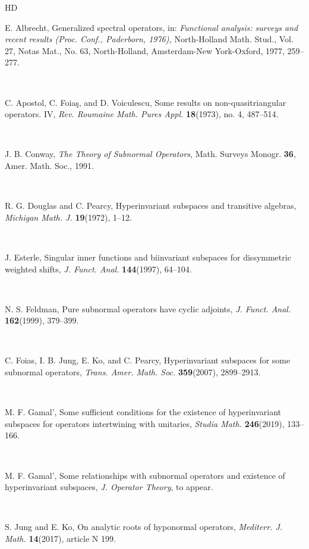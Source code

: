 \documentclass[a4paper,oneside,11pt]{amsart}
\numberwithin{equation}{section}
\theoremstyle{plain}
\theoremstyle{definition}
\begin{document}
\begin{thebibliography}{HD}

\normalsize
\baselineskip=11pt

 E. Albrecht, Generalized spectral operators, in: 
\emph{Functional analysis: surveys and recent results (Proc. Conf., Paderborn, 1976),} 
 North-Holland Math. Stud., Vol. 27, Notas Mat., No. 63, North-Holland,
Amsterdam-New York-Oxford, 1977, 259--277. 

\ 

 C. Apostol, C. Foia\c s, and D. Voiculescu, Some results on non-quasitriangular operators. IV, 
\emph{Rev. Roumaine Math. Pures Appl.} {\bf 18}(1973), no. 4, 487--514.

\ 

 J. B. Conway, \emph{The Theory of Subnormal Operators}, Math. Surveys Monogr. {\bf 36}, 
Amer. Math. Soc., 1991.

\ 

 R. G. Douglas and C. Pearcy, Hyperinvariant subspaces and transitive algebras, 
\emph{Michigan Math. J.}  {\bf 19}(1972), 1--12.
 
 \ 
 
 J. Esterle, Singular inner functions and biinvariant subspaces 
for dissymmetric weighted shifts,
 \emph{J. Funct.  Anal.} {\bf 144}(1997), 64--104.

\ 

  N. S. Feldman, Pure subnormal operators have cyclic adjoints, 
 \emph{J. Funct. Anal.} {\bf 162}(1999),  379--399.

\ 

 C. Foias, I. B. Jung, E. Ko, and C. Pearcy, Hyperinvariant subspaces for some subnormal operators, \emph{Trans. Amer. Math. Soc.} {\bf 359}(2007), 
2899--2913.


\ 

 M. F. Gamal', Some sufficient conditions for the existence 
of hyperinvariant subspaces for operators intertwining with unitaries,
\emph{Studia Math.} {\bf 246}(2019), 133--166. 

\ 

 M. F. Gamal', Some relationships with subnormal operators and existence of hyperinvariant subspaces, \emph{J. Operator Theory}, to appear. 

\ 
 
 S. Jung and E. Ko, On analytic roots of hyponormal operators, \emph{Mediterr. J. Math.} {\bf 14}(2017),
 article N 199.


\end{thebibliography}
\end{document}
